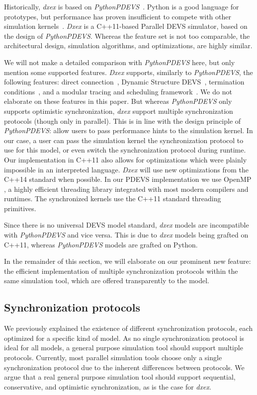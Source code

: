 Historically, \textit{dxex} is based on \textit{PythonPDEVS}~\cite{PythonPDEVS}.
Python is a good language for prototypes, but performance has proven insufficient to compete with other simulation kernels~\cite{MasterThesis}.
\textit{Dxex} is a C++11-based \textsf{Parallel DEVS} simulator, based on the design of \textit{PythonPDEVS}.
Whereas the feature set is not too comparable, the architectural design, simulation algorithms, and optimizations, are highly similar.

We will not make a detailed comparison with \textit{PythonPDEVS} here, but only mention some supported features.
\textit{Dxex} supports, similarly to \textit{PythonPDEVS}, the following features: direct connection~\cite{SymbolicFlattening}, \textsf{Dynamic Structure DEVS}~\cite{DSDEVS}, termination conditions~\cite{JDF}, and a modular tracing and scheduling framework~\cite{PythonPDEVS}.
We do not elaborate on these features in this paper.
But whereas \textit{PythonPDEVS} only supports optimistic synchronization, \textit{dxex} support multiple synchronization protocols (though only in parallel).
This is in line with the design principle of \textit{PythonPDEVS}: allow users to pass performance hints to the simulation kernel.
In our case, a user can pass the simulation kernel the synchronization protocol to use for this model, or even switch the synchronization protocol during runtime.
Our implementation in C++11 also allows for optimizations which were plainly impossible in an interpreted language. \textit{Dxex} will use new optimizations from the C++14 standard when possible.
In our PDEVS implementation we use OpenMP \cite{openmp4}, a highly efficient threading library integrated with most modern compilers and runtimes. 
The synchronized kernels use the C++11 standard threading primitives.

Since there is no universal \textsf{DEVS} model standard, \textit{dxex} models are incompatible with \textit{PythonPDEVS} and vice versa.
This is due to \textit{dxex} models being grafted on C++11, whereas \textit{PythonPDEVS} models are grafted on Python.

In the remainder of this section, we will elaborate on our prominent new feature: the efficient implementation of multiple synchronization protocols within the same simulation tool, which are offered transparently to the model.

\subsection{Synchronization protocols}
We previously explained the existence of different synchronization protocols, each optimized for a specific kind of model.
As no single synchronization protocol is ideal for all models, a general purpose simulation tool should support multiple protocols.
Currently, most parallel simulation tools choose only a single synchronization protocol due to the inherent differences between protocols.
We argue that a real general purpose simulation tool should support sequential, conservative, and optimistic synchronization, as is the case for \textit{dxex}.

